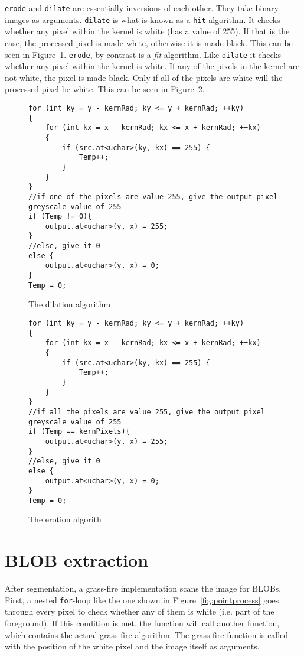 \texttt{erode} and \texttt{dilate} are essentially inversions of each other. They take binary images as arguments. \texttt{dilate} is what is known as a \texttt{hit} algorithm. It checks whether any pixel within the kernel is white (has a value of 255). If that is the case, the processed pixel is made white, otherwise it is made black. This can be seen in Figure~\ref{fig:dilateAlgorith}. \texttt{erode}, by contrast is a \textit{fit} algorithm. Like \texttt{dilate} it checks whether any pixel within the kernel is white. If any of the pixels in the kernel are not white, the pixel is made black. Only if all of the pixels are white will the processed pixel be white. This can be seen in Figure~\ref{fig:erodeAlgorithm}.

\begin{figure}
\begin{lstlisting}
for (int ky = y - kernRad; ky <= y + kernRad; ++ky)
{
	for (int kx = x - kernRad; kx <= x + kernRad; ++kx)
	{
		if (src.at<uchar>(ky, kx) == 255) {
			Temp++;
		}
	}
}
//if one of the pixels are value 255, give the output pixel greyscale value of 255
if (Temp != 0){
	output.at<uchar>(y, x) = 255;
}
//else, give it 0
else {
	output.at<uchar>(y, x) = 0;
}
Temp = 0;
\end{lstlisting}
\caption{The dilation algorithm \label{fig:dilateAlgorith}}
\end{figure}

\begin{figure}
\begin{lstlisting}
for (int ky = y - kernRad; ky <= y + kernRad; ++ky)
{
	for (int kx = x - kernRad; kx <= x + kernRad; ++kx)
	{
		if (src.at<uchar>(ky, kx) == 255) {
			Temp++;
		}
	}
}
//if all the pixels are value 255, give the output pixel greyscale value of 255
if (Temp == kernPixels){
	output.at<uchar>(y, x) = 255;
}
//else, give it 0
else {
	output.at<uchar>(y, x) = 0;
}
Temp = 0;
\end{lstlisting}
\caption{The erotion algorith\label{fig:erodeAlgorithm}}
\end{figure}

\section{BLOB extraction}
After segmentation, a grass-fire implementation scans the image for BLOBs. First, a nested \texttt{for}-loop like the one shown in Figure~\ref{fig:pointprocess} goes through every pixel to check whether any of them is white (i.e. part of the foreground). If this condition is met, the function will call another function, which contains the actual grass-fire algorithm. The grass-fire function is called with the position of the white pixel and the image itself as arguments. 

